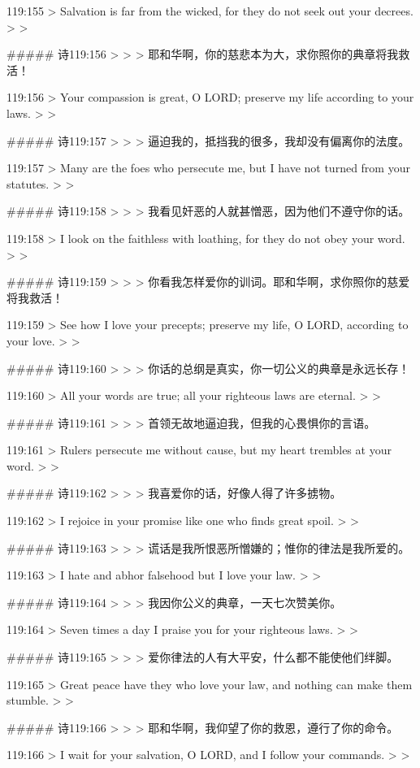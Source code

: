 119:155
> Salvation is far from the wicked, for they do not seek out your decrees.
>
> 


##### 诗119:156
> 
>
> 耶和华啊，你的慈悲本为大，求你照你的典章将我救活！


119:156
> Your compassion is great, O LORD; preserve my life according to your laws.
>
> 


##### 诗119:157
> 
>
> 逼迫我的，抵挡我的很多，我却没有偏离你的法度。


119:157
> Many are the foes who persecute me, but I have not turned from your statutes.
>
> 


##### 诗119:158
> 
>
> 我看见奸恶的人就甚憎恶，因为他们不遵守你的话。


119:158
> I look on the faithless with loathing, for they do not obey your word.
>
> 


##### 诗119:159
> 
>
> 你看我怎样爱你的训词。耶和华啊，求你照你的慈爱将我救活！


119:159
> See how I love your precepts; preserve my life, O LORD, according to your love.
>
> 


##### 诗119:160
> 
>
> 你话的总纲是真实，你一切公义的典章是永远长存！


119:160
> All your words are true; all your righteous laws are eternal.
>
> 


##### 诗119:161
> 
>
> 首领无故地逼迫我，但我的心畏惧你的言语。


119:161
> Rulers persecute me without cause, but my heart trembles at your word.
>
> 


##### 诗119:162
> 
>
> 我喜爱你的话，好像人得了许多掳物。


119:162
> I rejoice in your promise like one who finds great spoil.
>
> 


##### 诗119:163
> 
>
> 谎话是我所恨恶所憎嫌的；惟你的律法是我所爱的。


119:163
> I hate and abhor falsehood but I love your law.
>
> 


##### 诗119:164
> 
>
> 我因你公义的典章，一天七次赞美你。


119:164
> Seven times a day I praise you for your righteous laws.
>
> 


##### 诗119:165
> 
>
> 爱你律法的人有大平安，什么都不能使他们绊脚。


119:165
> Great peace have they who love your law, and nothing can make them stumble.
>
> 


##### 诗119:166
> 
>
> 耶和华啊，我仰望了你的救恩，遵行了你的命令。


119:166
> I wait for your salvation, O LORD, and I follow your commands.
>
> 


